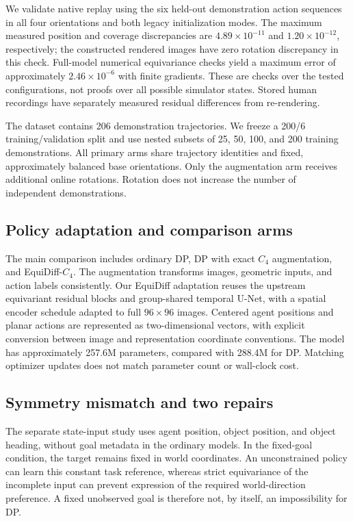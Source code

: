 We validate native replay using the six held-out demonstration action
sequences in all four orientations and both legacy initialization modes.
The maximum measured position and coverage discrepancies are
$4.89\times10^{-11}$ and $1.20\times10^{-12}$, respectively; the constructed
rendered images have zero rotation discrepancy in this check. Full-model
numerical equivariance checks yield a maximum error of approximately
$2.46\times10^{-6}$ with finite gradients. These are checks over the tested
configurations, not proofs over all possible simulator states. Stored human
recordings have separately measured residual differences from re-rendering.

The dataset contains 206 demonstration trajectories. We freeze a 200/6
training/validation split and use nested subsets of 25, 50, 100, and 200
training demonstrations. All primary arms share trajectory identities and
fixed, approximately balanced base orientations. Only the augmentation arm
receives additional online rotations. Rotation does not increase the number
of independent demonstrations.

\subsection{Policy adaptation and comparison arms}
The main comparison includes ordinary DP, DP with exact $C_4$ augmentation,
and EquiDiff-$C_4$. The augmentation transforms images, geometric inputs,
and action labels consistently. Our EquiDiff adaptation reuses the upstream
equivariant residual blocks and group-shared temporal U-Net, with a spatial
encoder schedule adapted to full $96\times96$ images. Centered agent positions
and planar actions are represented as two-dimensional vectors, with explicit
conversion between image and representation coordinate conventions.
The model has approximately 257.6M parameters, compared with 288.4M for DP.
Matching optimizer updates does not match parameter count or wall-clock cost.

\subsection{Symmetry mismatch and two repairs}
The separate state-input study uses agent position, object position, and
object heading, without goal metadata in the ordinary models. In the
fixed-goal condition, the target remains fixed in world coordinates. An
unconstrained policy can learn this constant task reference, whereas strict
equivariance of the incomplete input can prevent expression of the required
world-direction preference. A fixed unobserved goal is therefore not, by
itself, an impossibility for DP.

